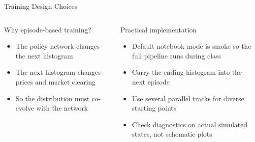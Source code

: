 \documentclass[aspectratio=169,11pt]{beamer}
\newcommand{\emphc}[1]{\textcolor{harvardcrimson}{#1}}
\begin{document}
\begin{frame}{Training Design Choices}
\small
\begin{columns}[T]
\begin{block}{Why episode-based training?}
\begin{itemize}\itemsep3pt
    \item The policy network changes the next histogram
    \item The next histogram changes prices and market clearing
    \item So the distribution must \emphc{co-evolve} with the network
\end{itemize}
\end{block}

\begin{block}{Practical implementation}
\begin{itemize}\itemsep3pt
    \item Default notebook mode is \emphc{smoke} so the full pipeline runs during class
    \item Carry the ending histogram into the next episode
    \item Use several parallel tracks for diverse starting points
    \item Check diagnostics on actual simulated states, not schematic plots
\end{itemize}
\end{block}
\end{columns}
\end{frame}
\end{document}
